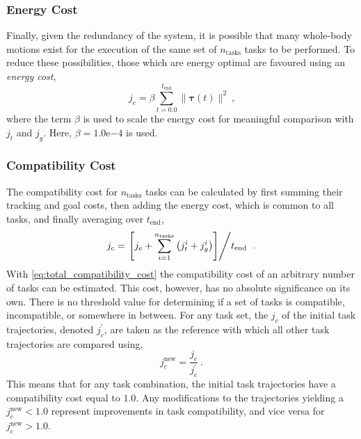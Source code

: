 \documentclass[12pt,a4paper,twoside]{article}
\newcommand{\bs}[1]{\boldsymbol{#1}}
\newcommand{\tc}{\ \text{,}}
\newcommand{\tp}{\ \text{.}}
\begin{document}
    \subsubsection{Energy Cost}
        Finally, given the redundancy of the system, it is possible that many whole-body motions exist for the execution of the same set of $n_{\text{tasks}}$ tasks to be performed. To reduce these possibilities, those which are energy optimal are favoured using an \textit{energy cost},
        \begin{equation}
        \label{eq:energy_cost}
        j_{e} = \beta \displaystyle\sum_{t=0.0}^{t_{\text{end}}} \|\bs{\tau}(t) \|^2  \tc
        \end{equation}
        where the term $\beta$ is used to scale the energy cost for meaningful comparison with $j_{t}$ and $j_{g}$. Here, $\beta=1.0\text{e}{-4}$ is used.

    \subsubsection{Compatibility Cost}
        The compatibility cost for $n_{\text{tasks}}$ tasks can be calculated by first summing their tracking and goal costs, then adding the energy cost, which is common to all tasks, and finally averaging over $t_{\text{end}}$,
        \begin{equation}
        \label{eq:total_compatibility_cost}
        j_{c} = \left. \left[ j_{e} + \displaystyle\sum_{i=1}^{n_{\text{tasks}}} \left( j_{t}^{i} + j_{g}^{i} \right) \right] \middle/ t_{\text{end}} \right. \tp
        \end{equation}
        With \eqref{eq:total_compatibility_cost}  the compatibility cost of an arbitrary number of tasks can be estimated. This cost, however, has no absolute significance on its own. There is no threshold value for determining if a set of tasks is compatible, incompatible, or somewhere in between. For any task set, the $j_{c}$ of the initial task trajectories, denoted $j_{c}^{\prime}$, are taken as the reference with which all other task trajectories are compared using,
        \begin{equation}
        \label{eq:scaling_total_compatibility_cost}
        j_{c}^{\text{new}} = \frac{j_{c}}{j_{c}^{\prime}} \tp
        \end{equation}
        This means that for any task combination, the initial task trajectories have a compatibility cost equal to $1.0$. Any modifications to the trajectories yielding a $j_{c}^{\text{new}} < 1.0$ represent improvements in task compatibility, and vice versa for $j_{c}^{\text{new}} > 1.0$.\\
\end{document}
